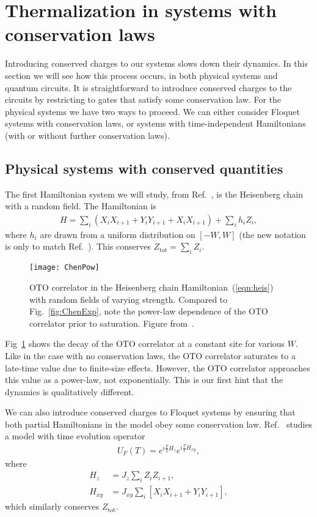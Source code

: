 \documentclass[a4paper,11pt]{article}
\newcommand{\tot}{\text{tot}}
\newcommand{\nn}{\nonumber\\}
\begin{document}
\section{Thermalization in systems with conservation laws} \label{sec:cons}

Introducing conserved charges to our systems slows down their dynamics. In this section we will see how this process occurs, in both physical systems and quantum circuits. It is straightforward to introduce conserved charges to the circuits by restricting to gates that satisfy some conservation law. For the physical systems we have two ways to proceed. We can either consider Floquet systems with conservation laws, or systems with time-independent Hamiltonians (with or without further conservation laws).

\subsection{Physical systems with conserved quantities} \label{sub:fcons}

The first Hamiltonian system we will study, from Ref.~\cite{ChenOtoc}, is the Heisenberg chain with a random field. The Hamiltonian is
\begin{align}
H = \sum_i\left(X_iX_{i+1} + Y_iY_{i+1} + X_iX_{i+1}\right)+\sum_i h_iZ_i,
	\label{eqn:heis}
\end{align}
where ${h_i}$ are drawn from a uniform distribution on $[-W,W]$ (the new notation is only to match Ref.~\cite{ChenOtoc}). This conserves $Z_\tot=\sum_i Z_i$. 
\begin{figure}
	\centering
	\texttt{[image: ChenPow]}
	\caption{OTO correlator in the Heisenberg chain Hamiltonian~(\ref{eqn:heis}) with random fields of varying strength. Compared to Fig.~\ref{fig:ChenExp}, note the power-law dependence of the OTO correlator prior to saturation. Figure from~\cite{ChenOtoc}.}
	\label{fig:ChenPow}
\end{figure}
Fig~\ref{fig:ChenPow} shows the decay of the OTO correlator at a constant site for various $W$. Like in the case with no conservation laws, the OTO correlator saturates to a late-time value due to finite-size effects. However, the OTO correlator approaches this value as a power-law, not exponentially. This is our first hint that the dynamics is qualitatively different.

We can also introduce conserved charges to Floquet systems by ensuring that both partial Hamiltonians in the model obey some conservation law. Ref.~\cite{KhemaniOpSp} studies a model with time evolution operator
\begin{align}
U_F(T)=e^{i\frac{T}{2}H_z}e^{i\frac{T}{2}H_{xy}}, \label{fig:khemFloq}
\end{align}
where
\begin{align}
H_z &= J_z\sum_i Z_iZ_{i+1},\nn
H_{xy} &= J_{xy}\sum_i\left[X_iX_{i+1}+Y_iY_{i+1}\right],
\end{align}
which similarly conserves $Z_\tot$.
\end{document}
